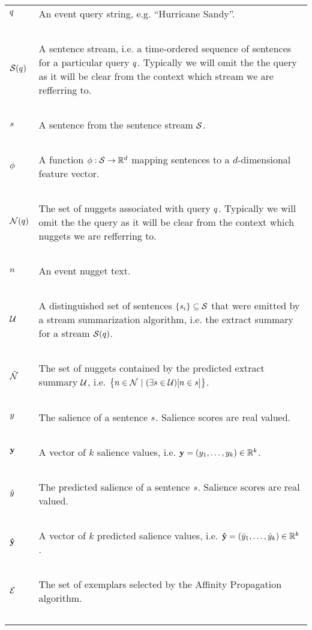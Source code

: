 \begin{tabular}[t]{p{1.1cm} p{13cm}}
    $q$ & An event query string, e.g. ``Hurricane Sandy''.\\~\\
    $\mathcal{S}(q)$ & A sentence stream, i.e. a time-ordered sequence of 
                 sentences for a particular query $q$.
                 Typically we will omit the the query as it will be clear
                 from the context which stream we are refferring to.\\~\\
    $s$ & A sentence from the sentence stream $\mathcal{S}$.\\ ~\\
    $\phi$ & A function $\phi : \mathcal{S} \rightarrow \mathbb{R}^{d}$ mapping 
                sentences to a $d$-dimensional feature vector.  \\~\\
    $\mathcal{N}(q)$ & The set of nuggets associated with query $q$.
                 Typically we will omit the the query as it will be clear
                 from the context which nuggets we are refferring to.\\~\\
    $n$ & An event nugget text. \\~\\
    $\mathcal{U}$ & A distinguished set of sentences 
                 $\{s_i\}\subseteq \mathcal{S}$ that were emitted
                 by a stream summarization algorithm, i.e. the extract 
                 summary for a stream $\mathcal{S}(q)$.\\~\\
    $\hat{\mathcal{N}}$ & The set of nuggets contained by the predicted 
                    extract summary $\mathcal{U}$,
                     i.e. $\big\{n \in \mathcal{N}\ |\  
                        (\exists s \in \mathcal{U})
                        [ n \in s] \big\}$.\\~\\
   $y$ & The salience of a sentence $s$. Salience
                 scores are real valued.\\~\\
   $\mathbf{y}$ & A vector of $k$ salience values, i.e. 
$\mathbf{y} = (y_1, \ldots, y_k) \in \mathbb{R}^{k}$.\\~\\
   $\hat{y}$ & The predicted salience of a sentence $s$. Salience
                 scores are real valued.\\~\\
   $\mathbf{\hat{y}}$ & A vector of $k$ predicted salience values, i.e. 
$\mathbf{\hat{y}} = (\hat{y}_1, \ldots, \hat{y}_k) \in \mathbb{R}^{k}$.\\~\\
$\mathcal{E}$ & The set of exemplars selected by the Affinity Propagation
                algorithm. \\~\\


\end{tabular}


